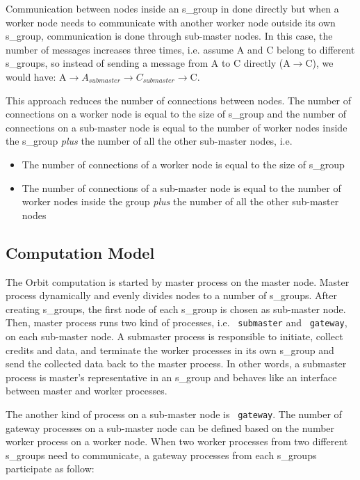 \documentclass[11pt,a4paper]{article}
\begin{document}
Communication between nodes inside an s\_group in done directly but when a worker node needs to communicate with another worker node outside its own s\_group, communication is done through sub-master nodes. In this case, the number of messages increases three times, i.e. assume A and C belong to different s\_groups, so instead of sending a message from A to C directly (A$\rightarrow$C), we would have: A$\rightarrow A_{submaster}\rightarrow C_{submaster}\rightarrow$C. 

This approach reduces the number of connections between nodes. The  number of connections on a worker node is equal to the size of s\_group and the number of connections on a sub-master node is equal to the number of worker nodes inside the s\_group \emph{plus} the number of all the other sub-master nodes, i.e.
\begin{itemize}
\item The number of connections of a worker node is equal to the size of s\_group 
\item The number of connections of a sub-master node is equal to the number of worker nodes inside the group \emph{plus} the number of all the other sub-master nodes
\end{itemize}

\subsection*{Computation Model}

The Orbit computation is started by master process on the master node. Master process dynamically and evenly divides  nodes to a number of s\_groups. After creating s\_groups, the first node of each s\_group is chosen as sub-master node. Then, master process runs two kind of processes, i.e. ~\texttt{submaster} and ~\texttt{gateway}, on each sub-master node. A submaster process is responsible to initiate, collect credits and data, and terminate the worker processes in its own s\_group and send the collected data back to the master process. In other words, a submaster process is master's representative in an s\_group and behaves like an interface between master and worker processes.

The another kind of process on a sub-master node is ~\texttt{gateway}. The number of gateway processes on a sub-master node can be defined based on the number worker process on a worker node. When two worker processes from two different s\_groups need to communicate, a gateway processes from each s\_groups participate as follow:
\end{document}
